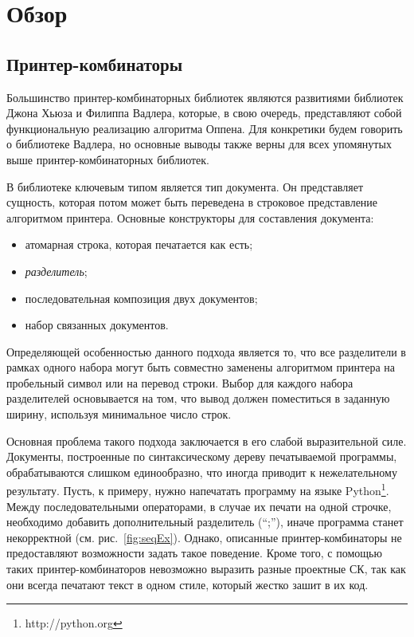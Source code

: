 \section{Обзор}

\subsection{Принтер-комбинаторы}

Большинство принтер-комбинаторных библиотек\cite{
swierstraChitil, swierstra04, peytonJones, kiselyov, chitil, swiComb}
являются развитиями библиотек
Джона Хьюза\cite{hughes} и Филиппа Вадлера\cite{wadler}, которые,
в свою очередь, представляют собой функциональную реализацию алгоритма
Оппена\cite{oppen}.
Для конкретики будем говорить о библиотеке Вадлера, но основные выводы
также верны для всех упомянутых выше принтер-комбинаторных библиотек.

В библиотеке ключевым типом является тип документа.
Он представляет сущность, которая потом может
быть переведена в строковое представление алгоритмом принтера.
Основные конструкторы для составления документа:
\begin{itemize}
  \item атомарная строка, которая печатается как есть;
  \item \emph{разделитель};
  \item последовательная композиция двух документов;
  \item набор связанных документов.
\end{itemize}

Определяющей особенностью данного подхода является то, что все разделители
в рамках одного набора могут быть совместно заменены алгоритмом принтера
на пробельный символ или на перевод строки. Выбор для каждого набора разделителей
основывается на том, что вывод должен поместиться в заданную ширину,
используя минимальное число строк.

Основная проблема такого подхода заключается в его слабой выразительной силе.
Документы, построенные по синтаксическому дереву печатываемой программы,
обрабатываются слишком единообразно, что иногда приводит к нежелательному результату.
Пусть, к примеру, нужно напечатать программу на языке Python\footnote{http://python.org}.
Между последовательными операторами, в случае их печати на одной строчке, необходимо
добавить дополнительный разделитель (``;''), иначе программа станет некорректной
(см. рис.~\ref{fig:seqEx}). Однако, описанные принтер-комбинаторы не предоставляют
возможности задать такое поведение.
Кроме того, с помощью таких принтер-комбинаторов невозможно выразить разные проектные СК,
так как они всегда печатают текст в одном стиле, который жестко зашит в их код.

